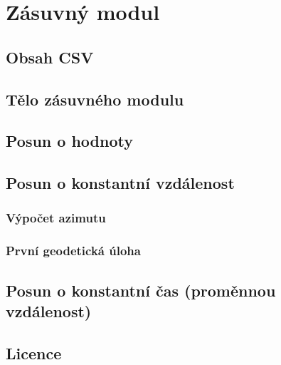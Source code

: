 \chapter{Zásuvný modul}
\label{4-plugin}




\section{Obsah CSV}
\label{obsah}

\section{Tělo zásuvného modulu}
\label{telo}

\section{Posun o hodnoty}
\label{by_points}

\section{Posun o konstantní vzdálenost}
\label{by_distance}

\subsection{Výpočet azimutu}
\label{by_distance}

\subsection{První geodetická úloha}
\label{prvnigu}

\section{Posun o konstantní čas (proměnnou vzdálenost)}
\label{by_seconds}

\section{Licence}
\label{licence}



